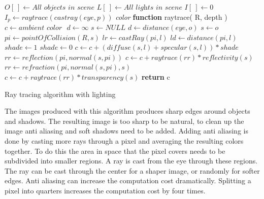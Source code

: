 \documentclass[11pt,a4paper,oneside]{article}
\begin{document}
\begin{algorithm}[H]
\begin{algorithmic}[1]
\STATE $O[\ ] \gets \textit{All objects in scene}$ 
\STATE $L[\ ] \gets \textit{All lights in scene}$
\STATE $I[\ ] \gets 0$ 
\STATE
{}
	\STATE $I_{p} \gets raytrace( castray( eye, p ))$
\ENDFOR
\STATE 
\STATE \textit{color} \textbf{function} raytrace(  R, depth )
	\STATE $c  \gets \textit{ambient color } $
	\STATE $d \gets \infty $
	\STATE $s \gets \textit{NULL}$
				\STATE $d \gets distance( \textit{eye}, o )$
				\STATE $s \gets o$
			\ENDIF
		\ENDIF
	\ENDFOR
		\STATE {}
		\STATE $pi \gets pointOfCollision( R, s )$
			\STATE $lr \gets castRay( pi, l )$
			\STATE $ld \gets distance( pi, l )$
			\STATE $shade \gets 1$
					\STATE $shade \gets 0$				
				\ENDIF
				\STATE $c \gets c +( diffuse( s, l ) + specular( s, l )) * shade$ 
			\ENDFOR
		\ENDFOR
		\STATE {}
			\STATE $rr \gets reflection( pi, normal( s, pi ))$
			\STATE $c \gets c + raytrace( rr ) * reflectivity( s )$
		\ENDIF
		\STATE {}
			\STATE $rr \gets refraction( pi, normal( s, pi ), s )$
			\STATE $c \gets c + raytrace( rr ) * transparency( s )$
		\ENDIF
	\ENDIF
	\STATE \textbf{return} c

\end{algorithmic}
\caption{ Ray tracing algorithm with lighting }
\label{ray-trace-full}
\end{algorithm}
\newpage

The images produced with this algorithm produces sharp edges around objects and shadows.  The resulting image is too sharp to be natural, to clean up the image anti aliasing and soft shadows need to be added.  Adding anti aliasing is done by casting more rays through a pixel and averaging the resulting colors together.  To do this the area in space that the pixel covers needs to be subdivided into smaller regions.  A ray is cast from the eye through these regions.  The ray can be cast through the center for a shaper image, or randomly for softer edges.  Anti aliasing can increase the computation cost dramatically.  Splitting a pixel into quarters increases the computation cost by four times.
\end{document}
